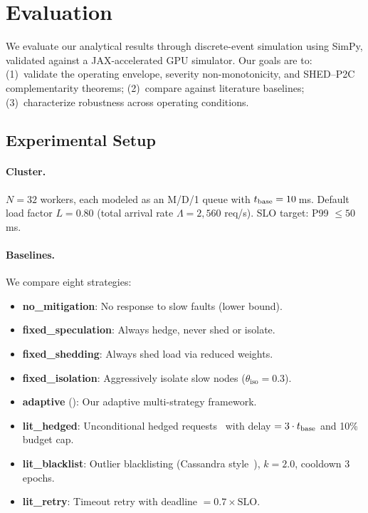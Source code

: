 \section{Evaluation}
\label{sec:evaluation}

We evaluate our analytical results through discrete-event simulation
using SimPy, validated against a JAX-accelerated GPU simulator. Our
goals are to: (1)~validate the operating envelope, severity
non-monotonicity, and SHED--P2C complementarity theorems;
(2)~compare against literature baselines; (3)~characterize robustness
across operating conditions.

\subsection{Experimental Setup}

\paragraph{Cluster.}
$N = 32$ workers, each modeled as an M/D/1 queue with $t_{\text{base}} =
10$\,ms. Default load factor $L = 0.80$ (total arrival rate
$\Lambda = 2{,}560$ req/s). SLO target: P99 $\leq 50$\,ms.

\paragraph{Baselines.}
We compare eight strategies:
\begin{itemize}
\item \textbf{no\_mitigation}: No response to slow faults (lower bound).
\item \textbf{fixed\_speculation}: Always hedge, never shed or isolate.
\item \textbf{fixed\_shedding}: Always shed load via reduced weights.
\item \textbf{fixed\_isolation}: Aggressively isolate slow nodes
  ($\theta_{\text{iso}} = 0.3$).
\item \textbf{adaptive} (\system{}): Our adaptive multi-strategy framework.
\item \textbf{lit\_hedged}: Unconditional hedged
  requests~\cite{dean2013tail} with delay $= 3 \cdot t_{\text{base}}$ and
  10\% budget cap.
\item \textbf{lit\_blacklist}: Outlier blacklisting (Cassandra
  style~\cite{lakshman2010cassandra}), $k = 2.0$, cooldown 3 epochs.
\item \textbf{lit\_retry}: Timeout retry with deadline $= 0.7 \times
  \text{SLO}$.
\end{itemize}

